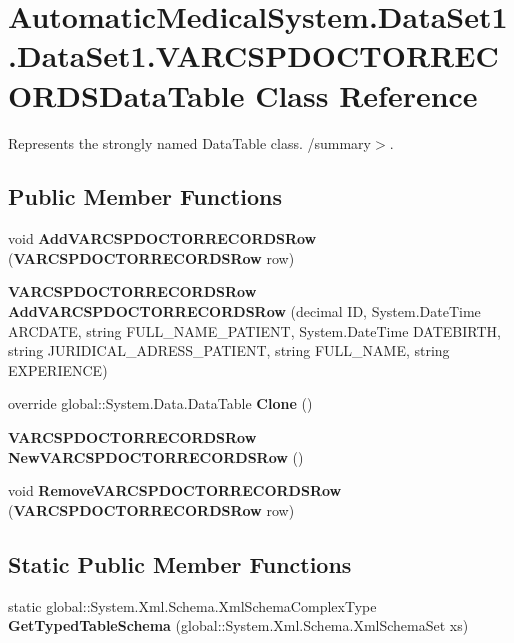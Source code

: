 \section{AutomaticMedicalSystem.DataSet1.DataSet1.VARCSPDOCTORRECORDSDataTable Class Reference}
\label{class_automatic_medical_system_1_1_data_set1_1_1_v_a_r_c_s_p_d_o_c_t_o_r_r_e_c_o_r_d_s_data_table}
Represents the strongly named DataTable class. /summary$>$.  


\subsection*{Public Member Functions}
\begin{CompactItemize}
\item 
void \textbf{AddVARCSPDOCTORRECORDSRow} ({\bf VARCSPDOCTORRECORDSRow} row)\label{class_automatic_medical_system_1_1_data_set1_1_1_v_a_r_c_s_p_d_o_c_t_o_r_r_e_c_o_r_d_s_data_table_8bb712885f045dabc567a3eb9fc53364}

\item 
{\bf VARCSPDOCTORRECORDSRow} \textbf{AddVARCSPDOCTORRECORDSRow} (decimal ID, System.DateTime ARCDATE, string FULL\_\-NAME\_\-PATIENT, System.DateTime DATEBIRTH, string JURIDICAL\_\-ADRESS\_\-PATIENT, string FULL\_\-NAME, string EXPERIENCE)\label{class_automatic_medical_system_1_1_data_set1_1_1_v_a_r_c_s_p_d_o_c_t_o_r_r_e_c_o_r_d_s_data_table_c89b79b07354e918ba3a7caaca9c1d53}

\item 
override global::System.Data.DataTable \textbf{Clone} ()\label{class_automatic_medical_system_1_1_data_set1_1_1_v_a_r_c_s_p_d_o_c_t_o_r_r_e_c_o_r_d_s_data_table_268e78acb74108847eb7956cf882acc5}

\item 
{\bf VARCSPDOCTORRECORDSRow} \textbf{NewVARCSPDOCTORRECORDSRow} ()\label{class_automatic_medical_system_1_1_data_set1_1_1_v_a_r_c_s_p_d_o_c_t_o_r_r_e_c_o_r_d_s_data_table_b7d7b1aedb4e1d40e49ebf11003f65a9}

\item 
void \textbf{RemoveVARCSPDOCTORRECORDSRow} ({\bf VARCSPDOCTORRECORDSRow} row)\label{class_automatic_medical_system_1_1_data_set1_1_1_v_a_r_c_s_p_d_o_c_t_o_r_r_e_c_o_r_d_s_data_table_eb48c407e31a521907b320a55f805456}

\end{CompactItemize}
\subsection*{Static Public Member Functions}
\begin{CompactItemize}
\item 
static global::System.Xml.Schema.XmlSchemaComplexType \textbf{GetTypedTableSchema} (global::System.Xml.Schema.XmlSchemaSet xs)\label{class_automatic_medical_system_1_1_data_set1_1_1_v_a_r_c_s_p_d_o_c_t_o_r_r_e_c_o_r_d_s_data_table_3e355ea8d2729a39c479cd3f0cbc8bfc}

\end{CompactItemize}
